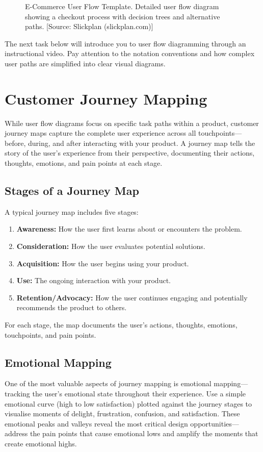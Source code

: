 \documentclass[12pt,a4paper]{article}
\begin{document}
\begin{figure}[h!]
    \centering
    \caption{E-Commerce User Flow Template. Detailed user flow diagram showing a checkout process with decision trees and alternative paths. [Source: Slickplan (slickplan.com)]}
\end{figure}

The next task below will introduce you to user flow diagramming through an instructional video. Pay attention to the notation conventions and how complex user paths are simplified into clear visual diagrams.

\section*{Customer Journey Mapping}
While user flow diagrams focus on specific task paths within a product, customer journey maps capture the complete user experience across all touchpoints—before, during, and after interacting with your product. A journey map tells the story of the user’s experience from their perspective, documenting their actions, thoughts, emotions, and pain points at each stage.

\subsection*{Stages of a Journey Map}
A typical journey map includes five stages:
\begin{enumerate}
    \item \textbf{Awareness:} How the user first learns about or encounters the problem.
    \item \textbf{Consideration:} How the user evaluates potential solutions.
    \item \textbf{Acquisition:} How the user begins using your product.
    \item \textbf{Use:} The ongoing interaction with your product.
    \item \textbf{Retention/Advocacy:} How the user continues engaging and potentially recommends the product to others.
\end{enumerate}
For each stage, the map documents the user’s actions, thoughts, emotions, touchpoints, and pain points.

\subsection*{Emotional Mapping}
One of the most valuable aspects of journey mapping is emotional mapping—tracking the user’s emotional state throughout their experience. Use a simple emotional curve (high to low satisfaction) plotted against the journey stages to visualise moments of delight, frustration, confusion, and satisfaction. These emotional peaks and valleys reveal the most critical design opportunities—address the pain points that cause emotional lows and amplify the moments that create emotional highs.
\end{document}
